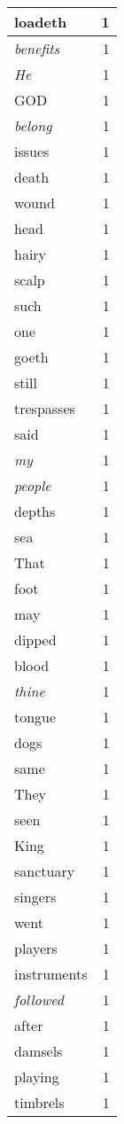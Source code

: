 \begin{center}
\begin{longtable}{l|r}
loadeth & 1 \\ \hline
\emph{benefits} & 1 \\ \hline
\emph{He} & 1 \\ \hline
GOD & 1 \\ \hline
\emph{belong} & 1 \\ \hline
issues & 1 \\ \hline
death & 1 \\ \hline
wound & 1 \\ \hline
head & 1 \\ \hline
hairy & 1 \\ \hline
scalp & 1 \\ \hline
such & 1 \\ \hline
one & 1 \\ \hline
goeth & 1 \\ \hline
still & 1 \\ \hline
trespasses & 1 \\ \hline
said & 1 \\ \hline
\emph{my} & 1 \\ \hline
\emph{people} & 1 \\ \hline
depths & 1 \\ \hline
sea & 1 \\ \hline
That & 1 \\ \hline
foot & 1 \\ \hline
may & 1 \\ \hline
dipped & 1 \\ \hline
blood & 1 \\ \hline
\emph{thine} & 1 \\ \hline
tongue & 1 \\ \hline
dogs & 1 \\ \hline
same & 1 \\ \hline
They & 1 \\ \hline
seen & 1 \\ \hline
King & 1 \\ \hline
sanctuary & 1 \\ \hline
singers & 1 \\ \hline
went & 1 \\ \hline
players & 1 \\ \hline
instruments & 1 \\ \hline
\emph{followed} & 1 \\ \hline
after & 1 \\ \hline
damsels & 1 \\ \hline
playing & 1 \\ \hline
timbrels & 1 \\ \hline

\end{longtable}
\end{center}
